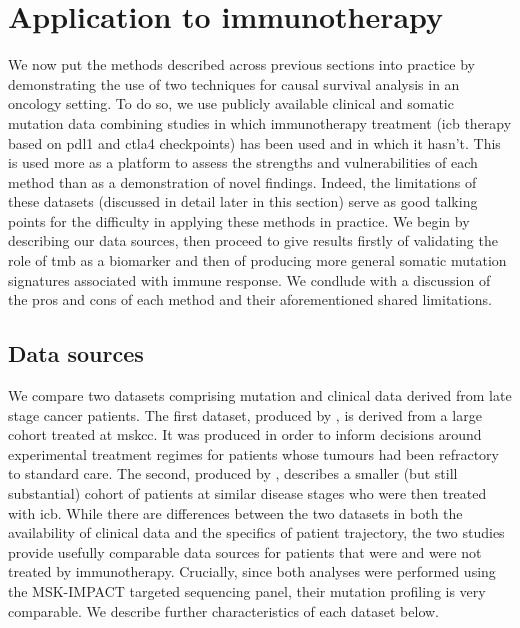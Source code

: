 \documentclass[../thesis.tex]{subfiles}
\begin{document}
\section{Application to immunotherapy \label{sec:immuno_hte}}
We now put the methods described across previous sections into practice by demonstrating the use of two techniques for causal survival analysis in an oncology setting. To do so, we use publicly available clinical and somatic mutation data combining studies in which immunotherapy treatment (\gls{icb} therapy based on \gls{pdl1} and \gls{ctla4} checkpoints) has been used and in which it hasn't. This is used more as a platform to assess the strengths and vulnerabilities of each method than as a demonstration of novel findings. Indeed, the limitations of these datasets (discussed in detail later in this section) serve as good talking points for the difficulty in applying these methods in practice. We begin by describing our data sources, then proceed to give results firstly of validating the role of \gls{tmb} as a biomarker and then of producing more general somatic mutation signatures associated with immune response. We condlude with a discussion of the pros and cons of each method and their aforementioned shared limitations.


\subsection{Data sources}
We compare two datasets comprising mutation and clinical data derived from late stage cancer patients. The first dataset, produced by \citet{zehir_mutational_2017}, is derived from a large cohort treated at \gls{mskcc}. It was produced in order to inform decisions around experimental treatment regimes for patients whose tumours had been refractory to standard care. The second, produced by \citet{hellmann_genomic_2018}, describes a smaller (but still substantial) cohort of patients at similar disease stages who were then treated with \gls{icb}. While there are differences between the two datasets in both the availability of clinical data and the specifics of patient trajectory, the two studies provide usefully comparable data sources for patients that were and were not treated by immunotherapy. Crucially, since both analyses were performed using the MSK-IMPACT targeted sequencing panel, their mutation profiling is very comparable. We describe further characteristics of each dataset below. 
\end{document}
